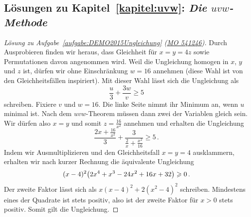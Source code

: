 
\subsection*{Lösungen zu Kapitel~\ref{kapitel:uvw}: \emph{Die \texorpdfstring{$uvw$}{uvw}-Methode}}

\begin{proof}[Lösung zu Aufgabe~\ref{aufgabe:DEMO2015Ungleichung} \textmd{(\href{https://www.mathematik-olympiaden.de/moev/index.php?option=com_download&thema=a&format=raw&datei=A54124b.pdf}{MO 541246})}]
	Durch Ausprobieren finden wir heraus, dass Gleichheit für $x=y=4z$ sowie Permutationen davon angenommen wird. Weil die Ungleichung homogen in $x$, $y$ und $z$ ist, dürfen wir ohne Einschränkung $w=16$ annehmen (diese Wahl ist von den Gleichheitsfällen inspiriert). Mit dieser Wahl lässt sich die Ungleichung als
	\begin{equation*}
		\frac{u}{3}+\frac{3w}{v}\geqslant 5
	\end{equation*}
	schreiben. Fixiere $v$ und $w=16$. Die linke Seite nimmt ihr Minimum an, wenn $u$ minimal ist. Nach dem $uvw$-Theorem müssen dann zwei der Variablen gleich sein. Wir dürfen also $x=y$ und somit $z=\frac{16}{x^2}$ annehmen und erhalten die Ungleichung
	\begin{equation*}
		\frac{2x+\frac{16}{x^2}}{3}+\frac{3}{\frac2x+\frac{x^2}{16}}\geqslant 5\,.
	\end{equation*}
	Indem wir Ausmultiplizieren und den Gleichheitsfall $x=y=4$ ausklammern, erhalten wir nach kurzer Rechnung die äquivalente Ungleichung
	\begin{equation*}
		(x-4)^2\parens*{2x^4+x^3-24x^2+16x+32}\geqslant 0\,.
	\end{equation*}
	Der zweite Faktor lässt sich als $x(x-4)^2+2(x^2-4)^2$ schreiben. Mindestens eines der Quadrate ist stets positiv, also ist der zweite Faktor für $x>0$ stets positiv. Somit gilt die Ungleichung.
\end{proof}


